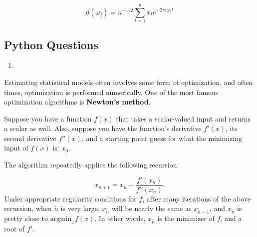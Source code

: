 \documentclass[
  12pt,
  krantz2]{krantz}
\providecommand{\tightlist}{%
  \setlength{\itemsep}{0pt}\setlength{\parskip}{0pt}}
\begin{document}
\begin{equation} \label{eq:DFT}
d(\omega_j)= n^{-1/2} \sum_{t=1}^n x_t e^{-2 \pi i \omega_j t}
\end{equation}

\hypertarget{python-questions-4}{%
\subsection{Python Questions}\label{python-questions-4}}

\begin{enumerate}
\def\labelenumi{\arabic{enumi}.}
\tightlist
\item
\end{enumerate}

Estimating statistical models often involves some form of optimization, and often times, optimization is performed numerically. One of the most famous optimization algorithms is \textbf{Newton's method}.

Suppose you have a function \(f(x)\) that takes a scalar-valued input and returns a scalar as well. Also, suppose you have the function's derivative \(f'(x)\), its second derivative \(f''(x)\), and a starting point guess for what the minimizing input of \(f(x)\) is: \(x_0\).

The algorithm repeatedly applies the following recursion:

\begin{equation} 
x_{n+1} = x_{n} - \frac{f'(x_n)}{f''(x_{n})}.
\end{equation}
Under appropriate regularity conditions for \(f\), after many iterations of the above recursion, when \(\tilde{n}\) is very large, \(x_{\tilde{n}}\) will be nearly the same as \(x_{\tilde{n}-1}\), and \(x_{\tilde{n}}\) is pretty close to \(\text{argmin}_x f(x)\). In other words, \(x_{\tilde{n}}\) is the minimizer of \(f\), and a root of \(f'\).
\end{document}
